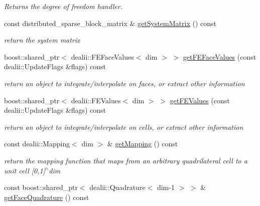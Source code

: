 \begin{DoxyCompactItemize}
\begin{DoxyCompactList}\small\item\em Returns the degree of freedom handler. \item\end{DoxyCompactList}\item 
\hypertarget{classnatrium_1_1AdvectionOperator_a5f64cd24839b7695fb4a88574c769b16}{
const distributed\_\-sparse\_\-block\_\-matrix \& \hyperlink{classnatrium_1_1AdvectionOperator_a5f64cd24839b7695fb4a88574c769b16}{getSystemMatrix} () const }
\label{classnatrium_1_1AdvectionOperator_a5f64cd24839b7695fb4a88574c769b16}

\begin{DoxyCompactList}\small\item\em return the system matrix \item\end{DoxyCompactList}\item 
boost::shared\_\-ptr$<$ dealii::FEFaceValues$<$ dim $>$ $>$ \hyperlink{classnatrium_1_1AdvectionOperator_acf26df77fa01498ff8de55e6d4c51311}{getFEFaceValues} (const dealii::UpdateFlags \&flags) const 
\begin{DoxyCompactList}\small\item\em return an object to integrate/interpolate on faces, or extract other information \item\end{DoxyCompactList}\item 
boost::shared\_\-ptr$<$ dealii::FEValues$<$ dim $>$ $>$ \hyperlink{classnatrium_1_1AdvectionOperator_ae786297e9fe77377841ff7e41fcd0d01}{getFEValues} (const dealii::UpdateFlags \&flags) const 
\begin{DoxyCompactList}\small\item\em return an object to integrate/interpolate on cells, or extract other information \item\end{DoxyCompactList}\item 
const dealii::Mapping$<$ dim $>$ \& \hyperlink{classnatrium_1_1AdvectionOperator_aab63eee00fc2b000c3fbae9552807607}{getMapping} () const 
\begin{DoxyCompactList}\small\item\em return the mapping function that maps from an arbitrary quadrilateral cell to a unit cell \mbox{[}0,1\mbox{]}$^\wedge$dim \item\end{DoxyCompactList}\item 
\hypertarget{classnatrium_1_1AdvectionOperator_ac9b50e9da1a6e900c36a2c4e0556d4cd}{
const boost::shared\_\-ptr$<$ dealii::Quadrature$<$ dim-\/1 $>$ $>$ \& \hyperlink{classnatrium_1_1AdvectionOperator_ac9b50e9da1a6e900c36a2c4e0556d4cd}{getFaceQuadrature} () const }
\label{classnatrium_1_1AdvectionOperator_ac9b50e9da1a6e900c36a2c4e0556d4cd}


\end{DoxyCompactItemize}
